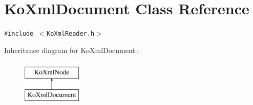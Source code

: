 \hypertarget{classKoXmlDocument}{
\section{KoXmlDocument Class Reference}
\label{classKoXmlDocument}
}
{\tt \#include $<$KoXmlReader.h$>$}

Inheritance diagram for KoXmlDocument::\begin{figure}[H]
\begin{center}
\leavevmode
\includegraphics[height=2cm]{classKoXmlDocument}
\end{center}
\end{figure}
